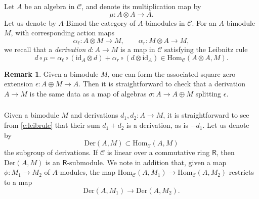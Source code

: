 \documentclass{amsart}
\theoremstyle{definition}
\newtheorem{Rem}[Thm]{Remark}
\newcommand{\sC}{\mathscr{C}}
\newcommand{\sss}{\subsubsection{}}
\newcommand{\Hom}{\on{Hom}}
\newcommand{\on}{\mathrm}
\newcommand{\Ring}{\mathsf{R}}
\numberwithin{equation}{section}
\begin{document}
\sss Let $A$ be an algebra in $\sC$, and denote its multiplication map by $$\mu: A \otimes A \rightarrow A.$$ Let us denote by $A\text{-Bimod}$ the category of $A$-bimodules in $\sC$. For an $A$-bimodule $M$, with corresponding action maps $$\alpha_\ell: A \otimes M \rightarrow M, \quad \quad \alpha_r: M \otimes A \rightarrow M,$$we recall that a {\it derivation} $d: A \rightarrow M$ is a map in $\sC$ satisfying the Leibnitz rule
\begin{equation} \label{e:leibrule}d \circ \mu = \alpha_\ell  \circ (\on{id}_A \otimes d)  + \alpha_r \circ (d \otimes \on{id}_A) \in \Hom_{\sC}(A \otimes A, M).\end{equation}

\begin{Rem} \label{r:splitderiv} Given a bimodule $M$, one can form the associated square zero extension $\epsilon: A \oplus M \rightarrow A$. Then it is straightforward to check that a derivation $A \rightarrow M$ is the same data as a map of algebras $\sigma: A \rightarrow A \oplus M$ splitting $\epsilon$. \end{Rem}

\sss Given a bimodule $M$ and derivations $d_1, d_2: A \rightarrow M$, it is straightforward to see from \eqref{e:leibrule} that their sum $d_1 + d_2$ is a derivation, as is $-d_1$. Let us denote by 
$$\on{Der}(A, M) \subset \Hom_{\sC}(A, M)$$
the {subgroup} of derivations. {If $\sC$ is linear over a commutative ring $\Ring$, then $\on{Der}(A, M)$ is an $\Ring$-submodule}. We note in addition that, given a map $\phi: M_1 \rightarrow M_2$ of $A$-modules, the map $\Hom_{\sC}(A, M_1) \rightarrow \Hom_{\sC}(A, M_2)$ restricts to a map 
$$\on{Der}(A, M_1) \rightarrow \on{Der}(A, M_2).$$
\end{document}
